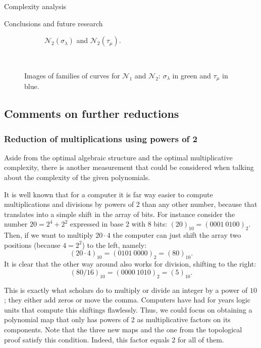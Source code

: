 \documentclass[11pt, a4paper, english, twoside, notitlepage, openright]{report}
\begin{document}
\begin{chapter}{Complexity analysis}
\begin{section}{Conclusions and future research}
\begin{figure}
\begin{subfigure}{.45\linewidth}
\vspace{-0.4cm}\caption{$\mathcal{N}_2(\sigma_{\lambda})$ and $\mathcal{N}_2(\tau_{\mu})$.\label{fig:5curves1}}
\end{subfigure}\\[1ex]
\vspace{-0.2cm}

\vspace{-0.1cm}\caption[Images of families of curves for $\mathcal{N}_1$ and $\mathcal{N}_2$.]{Images of families of curves for $\mathcal{N}_1$ and $\mathcal{N}_2$: $\sigma_{\lambda}$ in green and $\tau_{\mu}$ in blue.\label{fig:curvesfg2}}
\end{figure}

\subsection{Comments on further reductions}

\subsubsection{Reduction of multiplications using powers of 2}

Aside from the optimal algebraic structure and the optimal multiplicative complexity, there is another measurement that could be considered when talking about the complexity of the given polynomials.

It is well known that for a computer it is far way easier to compute multiplications and divisions by powers of 2 than any other number, because that translates into a simple shift in the array of bits. For instance consider the number $20 = 2^4 + 2^2$ expressed in base 2 with 8 bits: $(20)_{10} = (0001\ 0100)_2$. Then, if we want to multiply $20\cdot 4$ the computer can just shift the array two positions (because $4=2^2$) to the left, namely:
$$(20 \cdot 4)_{10} = (0101\ 0000)_2 = (80)_{10}.$$
It is clear that the other way around also works for division, shifting to the right:
$$(80 / 16)_{10} = (0000\ 1010)_2 = (5)_{10}.$$

This is exactly what scholars do to multiply or divide an integer by a power of $10$; they either add zeros or move the  comma. Computers have had for years logic units that compute this shiftings flawlessly. Thus, we could focus on obtaining a polynomial map that only has powers of 2 as multiplicative factors on its components. Note that the three new maps and the one from the topological proof satisfy this condition. Indeed, this factor equals 2 for all of them.


\end{section}
\end{chapter}
\end{document}
